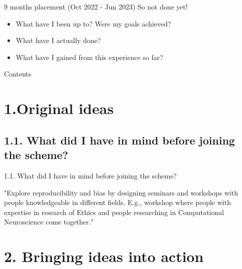 \documentclass[t]{beamer}
\subtitle{Enrichment experience}
\date{31/03/2023}
\author{Susana Roman Garcia, PhD student, University of Edinburgh.}
\begin{document}
\begin{frame}
	\titlepage
\end{frame}

\begin{frame}{9 months placement (Oct 2022 - Jun 2023) So not done yet!}
    \begin{itemize}
        \item What have I been up to? Were my goals achieved? 
        \item What have I actually done?
        \item What have I gained from this experience so far?
    \end{itemize}
\end{frame}

\begin{frame}{Contents}
	\tableofcontents
\end{frame}

\section{1.Original ideas}
\subsection{1.1. What did I have in mind before joining the scheme?}
\begin{frame}{1.1. What did I have in mind before joining the scheme?}
    \begin{block}{"Explore reproducibility and bias by designing seminars and workshops with people knowledgeable in different fields. E.g., workshop where people with expertise in research of Ethics and people researching in Computational Neuroscience come together."}
    \end{block}    

\end{frame}

\section{2. Bringing ideas into action}
\end{document}
